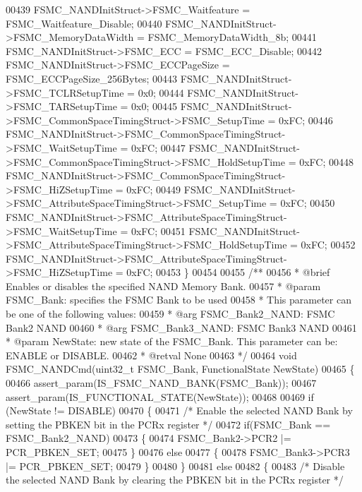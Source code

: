 \begin{DoxyCode}
00439   FSMC\_NANDInitStruct->FSMC_Waitfeature = FSMC_Waitfeature_Disable;
00440   FSMC\_NANDInitStruct->FSMC_MemoryDataWidth = FSMC_MemoryDataWidth_8b;
00441   FSMC\_NANDInitStruct->FSMC_ECC = FSMC_ECC_Disable;
00442   FSMC\_NANDInitStruct->FSMC_ECCPageSize = FSMC_ECCPageSize_256Bytes;
00443   FSMC\_NANDInitStruct->FSMC_TCLRSetupTime = 0x0;
00444   FSMC\_NANDInitStruct->FSMC_TARSetupTime = 0x0;
00445   FSMC\_NANDInitStruct->FSMC_CommonSpaceTimingStruct->FSMC_SetupTime = 0xFC;
00446   FSMC\_NANDInitStruct->FSMC_CommonSpaceTimingStruct->FSMC_WaitSetupTime = 0xFC;
00447   FSMC\_NANDInitStruct->FSMC_CommonSpaceTimingStruct->FSMC_HoldSetupTime = 0xFC;
00448   FSMC\_NANDInitStruct->FSMC_CommonSpaceTimingStruct->FSMC_HiZSetupTime = 0xFC;
00449   FSMC\_NANDInitStruct->FSMC_AttributeSpaceTimingStruct->FSMC_SetupTime = 0xFC;
00450   FSMC\_NANDInitStruct->FSMC_AttributeSpaceTimingStruct->FSMC_WaitSetupTime = 0xFC;
00451   FSMC\_NANDInitStruct->FSMC_AttributeSpaceTimingStruct->FSMC_HoldSetupTime = 0xFC;
00452   FSMC\_NANDInitStruct->FSMC_AttributeSpaceTimingStruct->FSMC_HiZSetupTime = 0xFC;
00453 \}
00454 
00455 \textcolor{comment}{/**}
00456 \textcolor{comment}{  * @brief  Enables or disables the specified NAND Memory Bank.}
00457 \textcolor{comment}{  * @param  FSMC\_Bank: specifies the FSMC Bank to be used}
00458 \textcolor{comment}{  *          This parameter can be one of the following values:}
00459 \textcolor{comment}{  *            @arg FSMC\_Bank2\_NAND: FSMC Bank2 NAND }
00460 \textcolor{comment}{  *            @arg FSMC\_Bank3\_NAND: FSMC Bank3 NAND}
00461 \textcolor{comment}{  * @param  NewState: new state of the FSMC\_Bank. This parameter can be: ENABLE or DISABLE.}
00462 \textcolor{comment}{  * @retval None}
00463 \textcolor{comment}{  */}
00464 \textcolor{keywordtype}{void} FSMC_NANDCmd(uint32\_t FSMC\_Bank, FunctionalState NewState)
00465 \{
00466   assert_param(IS\_FSMC\_NAND\_BANK(FSMC\_Bank));
00467   assert_param(IS\_FUNCTIONAL\_STATE(NewState));
00468 
00469   \textcolor{keywordflow}{if} (NewState != DISABLE)
00470   \{
00471     \textcolor{comment}{/* Enable the selected NAND Bank by setting the PBKEN bit in the PCRx register */}
00472     \textcolor{keywordflow}{if}(FSMC\_Bank == FSMC_Bank2_NAND)
00473     \{
00474       FSMC_Bank2->PCR2 |= PCR_PBKEN_SET;
00475     \}
00476     \textcolor{keywordflow}{else}
00477     \{
00478       FSMC_Bank3->PCR3 |= PCR_PBKEN_SET;
00479     \}
00480   \}
00481   \textcolor{keywordflow}{else}
00482   \{
00483     \textcolor{comment}{/* Disable the selected NAND Bank by clearing the PBKEN bit in the PCRx register */}

\end{DoxyCode}
